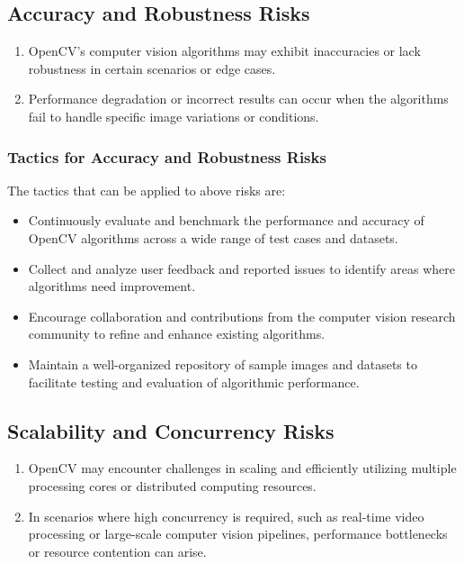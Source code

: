 \subsection{Accuracy and Robustness Risks \label{subSection::RobustnessRisk}}
\begin{enumerate}
     \item OpenCV's computer vision algorithms may exhibit inaccuracies or lack robustness in certain scenarios or edge cases.
     \item Performance degradation or incorrect results can occur when the algorithms fail to handle specific image variations or conditions. 
 \end{enumerate}

 \subsubsection{Tactics for Accuracy and Robustness Risks \label{subsubSection::RobustnessTactic}}
The tactics that can be applied to above risks are:
\begin{itemize}
     \item Continuously evaluate and benchmark the performance and accuracy of OpenCV algorithms across a wide range of test cases and datasets.
     \item Collect and analyze user feedback and reported issues to identify areas where algorithms need improvement.
     \item Encourage collaboration and contributions from the computer vision research community to refine and enhance existing algorithms.
     \item Maintain a well-organized repository of sample images and datasets to facilitate testing and evaluation of algorithmic performance.
\end{itemize}
\subsection{Scalability and Concurrency Risks \label{subSection::ScalabilityRisk}}
\begin{enumerate}
     \item OpenCV may encounter challenges in scaling and efficiently utilizing multiple processing cores or distributed computing resources.
     \item In scenarios where high concurrency is required, such as real-time video processing or large-scale computer vision pipelines, performance bottlenecks or resource contention can arise.
 \end{enumerate}

